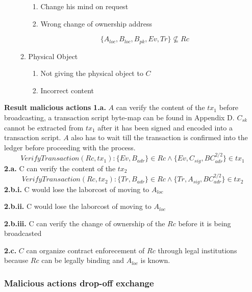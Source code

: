 \begin{enumerate}
\begin{enumerate}
\begin{enumerate}
      \item Change his mind on request
      \item Wrong change of ownership address
    \end{enumerate}
    \[\{A_{loc}, B_{loc}, B_{pk}, Ev, Tr\} \not\subseteq Rc\]
    \item Physical Object
    \begin{enumerate}
      \item Not giving the physical object to $C$
      \item Incorrect content
    \end{enumerate}
  \end{enumerate}
\end{enumerate}

\bigbreak
\noindent\textbf{Result malicious actions}
\bigbreak
\noindent\textbf{1.a.} $A$ can verify the content of the $tx_1$ before broadcasting, a transaction script byte-map can be found in Appendix D. $C_{sk}$ cannot be extracted from $tx_1$ after it has been signed and encoded into a transaction script. $A$ also has to wait till the transaction is confirmed into the ledger before proceeding with the process.
\[VerifyTransaction(Rc, tx_1)\colon \{Ev, B_{adr}\} \in Rc \land \{Ev, C_{sig},  BC_{adr}^{2/2}\} \in tx_1\]
\noindent\textbf{2.a.} C can verify the content of the $tx_2$
\[VerifyTransaction(Rc, tx_2)\colon\{Tr, B_{adr}\} \in Rc \land \{Tr, A_{sig}, BC_{adr}^{2/2}\} \in tx_2\]
\noindent\textbf{2.b.i.} C would lose the laborcost of moving to $A_{loc}$ \par
\noindent\textbf{2.b.ii.} C would lose the laborcost of moving to $A_{loc}$ \par
\noindent\textbf{2.b.iii.} C can verify the change of ownership of the $Rc$ before it is being broadcasted \par
\noindent\textbf{2.c.} $C$ can organize contract enforecement of $Rc$ through legal institutions because $Rc$ can be legally binding and $A_{loc}$ is known. \par

\subsubsection{Malicious actions drop-off exchange}

